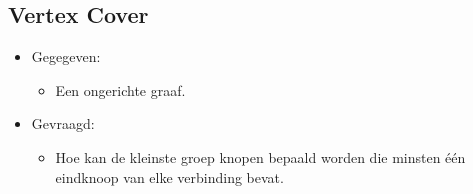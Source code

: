 \subsection{Vertex Cover}
\begin{itemize}
    \item Gegegeven:
    \begin{itemize}
        \item Een ongerichte graaf.
    \end{itemize}
    \item Gevraagd:
    \begin{itemize}
        \item Hoe kan de kleinste groep knopen bepaald worden die minsten één eindknoop van elke verbinding bevat.
    \end{itemize}
\end{itemize}